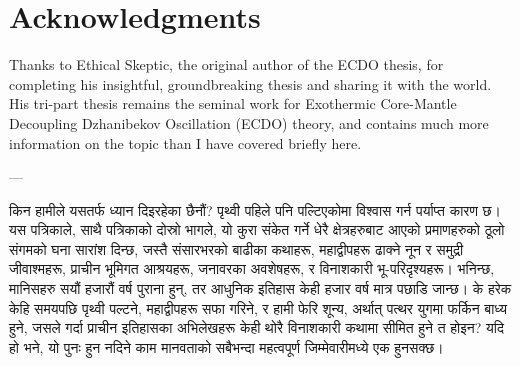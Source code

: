 \documentclass[10pt,twocolumn,letterpaper]{article}
\begin{document}
\section{Acknowledgments}

Thanks to Ethical Skeptic, the original author of the ECDO thesis, for completing his insightful, groundbreaking thesis and sharing it with the world. His tri-part thesis \cite{1} remains the seminal work for Exothermic Core-Mantle Decoupling Dzhanibekov Oscillation (ECDO) theory, and contains much more information on the topic than I have covered briefly here.

---

किन हामीले यसतर्फ ध्यान दिइरहेका छैनौं? पृथ्वी पहिले पनि पल्टिएकोमा विश्वास गर्न पर्याप्त कारण छ। यस पत्रिकाले, साथै पत्रिकाको दोस्रो भागले, यो कुरा संकेत गर्ने धेरै क्षेत्रहरुबाट आएको प्रमाणहरुको ठूलो संगमको घना सारांश दिन्छ, जस्तै संसारभरको बाढीका कथाहरू, महाद्वीपहरू ढाक्ने नून र समुद्री जीवाश्महरू, प्राचीन भूमिगत आश्रयहरू, जनावरका अवशेषहरू, र विनाशकारी भू-परिदृश्यहरू। भनिन्छ, मानिसहरु सयौं हजारौं वर्ष पुराना हुन्, तर आधुनिक इतिहास केही हजार वर्ष मात्र पछाडि जान्छ। के हरेक केहि समयपछि पृथ्वी पल्टने, महाद्वीपहरू सफा गरिने, र हामी फेरि शून्य, अर्थात् पत्थर युगमा फर्किन बाध्य हुने, जसले गर्दा प्राचीन इतिहासका अभिलेखहरू केही थोरै विनाशकारी कथामा सीमित हुने त होइन? यदि हो भने, यो पुनः हुन नदिने काम मानवताको सबैभन्दा महत्वपूर्ण जिम्मेवारीमध्ये एक हुनसक्छ।
\end{document}
